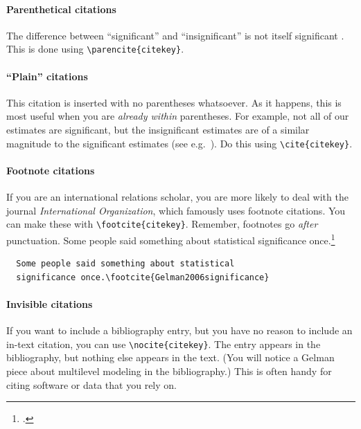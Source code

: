 \documentclass[12pt
              ]{article}
\begin{document}
\paragraph{Parenthetical citations} 
The difference between ``significant'' and ``insignificant'' is not itself significant \parencite{Gelman2006significance}. This is done using \verb+\parencite{citekey}+.

\paragraph{``Plain'' citations} 
This citation is inserted with no parentheses whatsoever. As it happens, this is most useful when you are \emph{already within} parentheses. For example, not all of our estimates are significant, but the insignificant estimates are of a similar magnitude to the significant estimates (see e.g.\ \cite{Gelman2006significance}). Do this using \verb+\cite{citekey}+.

\paragraph{Footnote citations}
If you are an international relations scholar, you are more likely to deal with the journal \emph{International Organization}, which famously uses footnote citations. You can make these with \verb+\footcite{citekey}+. Remember, footnotes go \emph{after} punctuation. Some people said something about statistical significance once.\footcite{Gelman2006significance}
\newline
\begin{minipage}{\linewidth}
\begin{lstlisting}
  Some people said something about statistical 
  significance once.\footcite{Gelman2006significance}
\end{lstlisting}
\end{minipage}


\paragraph{Invisible citations}
If you want to include a bibliography entry, but you have no reason to include an in-text citation, you can use \verb+\nocite{citekey}+. The entry appears in the bibliography, but nothing else appears in the text. (You will notice a Gelman piece about multilevel modeling in the bibliography.) This is often handy for citing software or data that you rely on. \nocite{Gelman2006multilevel}
\end{document}
